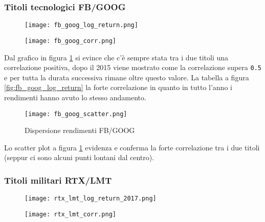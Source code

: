 \subsubsection{Titoli tecnologici FB/GOOG}

\begin{figure}[h]
  \centering
  \begin{minipage}{.4\textwidth}
    \centering
    \texttt{[image: fb\_goog\_log\_return.png]}
    \label{fig:fb_goog_log_return}
  \end{minipage}%
  \begin{minipage}{.6\textwidth}
    \centering
    \texttt{[image: fb\_goog\_corr.png]}
    \label{fig:fb_goog_corr}
  \end{minipage}
\end{figure}

Dal grafico in figura \ref{fig:fb_goog_corr} si evince che c'è sempre stata tra i due titoli una correlazione positiva, dopo
il 2015 viene mostrato come la correlazione supera \verb|0.5| e per tutta la durata successiva rimane oltre questo valore.
La tabella a figura \ref{fig:fb_goog_log_return} la forte correlazione in quanto in tutto l'anno i rendimenti hanno avuto lo stesso andamento.

\begin{figure}[h]
  \centering
  \texttt{[image: fb\_goog\_scatter.png]}
  \caption{Dispersione rendimenti FB/GOOG}
  \label{fig:fb_goog_disp}
\end{figure}

Lo scatter plot a figura \ref{fig:fb_goog_corr} evidenza e conferma la forte correlazione tra i due titoli (seppur ci sono alcuni punti lontani dal centro).

\pagebreak

\subsubsection{Titoli militari RTX/LMT}

\begin{figure}[h]
  \centering
  \begin{minipage}{.4\textwidth}
    \centering
    \texttt{[image: rtx\_lmt\_log\_return\_2017.png]}
    \label{fig:rtx_lmt_log_return_2017}
  \end{minipage}%
  \begin{minipage}{.6\textwidth}
    \centering
    \texttt{[image: rtx\_lmt\_corr.png]}
    \label{fig:rtx_lmt_corr}
  \end{minipage}
\end{figure}

